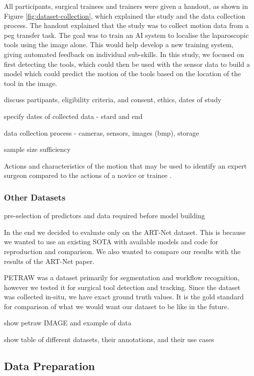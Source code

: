 All participants, surgical trainees and trainers were given a handout, as shown in Figure \ref{fig:dataset-collection}, which explained the study and the data collection process. The handout explained that the study was to collect motion data from a peg transfer task. The goal was to train an AI system to localise the laparoscopic tools using the image alone. This would help develop a new training system, giving automated feedback on individual sub-skills. In this study, we focused on first detecting the tools, which could then be used with the sensor data to build a model which could predict the motion of the tools based on the location of the tool in the image.

discuss partipants, eligibility criteria, and consent, ethics, dates of study

specify dates of collected data - stard and end

data collection process - cameras, sensors, images (bmp), storage

sample size sufficiency

Actions and characteristics of the motion that may be used to identify an expert surgeon compared to the actions of a novice or trainee \cite{jones_analysis_2018}.
\subsubsection{Other Datasets}

pre-selection of predictors and data required before model building

In the end we decided to evaluate only on the ART-Net dataset. This is because we wanted to use an existing SOTA with available models and code for reproduction and comparison. We also wanted to compare our results with the results of the ART-Net paper.

PETRAW was a dataset primarily for segmentation and workflow recognition, however we tested it for surgical tool detection and tracking. Since the dataset was collected in-situ, we have exact ground truth values. It is the gold standard for comparison of what we would want our dataset to be like in the future.

show petraw IMAGE and example of data

show table of different datasets, their annotations, and their use cases

\subsection{Data Preparation}

